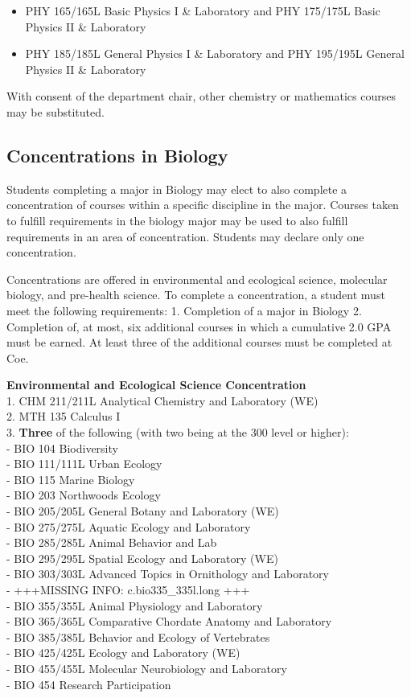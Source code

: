\documentclass[
  letterpaper,
]{scrbook}
\providecommand{\tightlist}{%
  \setlength{\itemsep}{0pt}\setlength{\parskip}{0pt}}
\begin{document}
\begin{itemize}
\tightlist
\item
  PHY 165/165L Basic Physics I \& Laboratory and PHY 175/175L Basic
  Physics II \& Laboratory
\item
  PHY 185/185L General Physics I \& Laboratory and PHY 195/195L General
  Physics II \& Laboratory
\end{itemize}

With consent of the department chair, other chemistry or mathematics
courses may be substituted.

\subsection{Concentrations in Biology}\label{concentrations-in-biology}

Students completing a major in Biology may elect to also complete a
concentration of courses within a specific discipline in the major.
Courses taken to fulfill requirements in the biology major may be used
to also fulfill requirements in an area of concentration. Students may
declare only one concentration.

Concentrations are offered in environmental and ecological science,
molecular biology, and pre-health science. To complete a concentration,
a student must meet the following requirements: 1. Completion of a major
in Biology 2. Completion of, at most, six additional courses in which a
cumulative 2.0 GPA must be earned. At least three of the additional
courses must be completed at Coe.

\textbf{Environmental and Ecological Science Concentration}\\
1. CHM 211/211L Analytical Chemistry and Laboratory (WE)\\
2. MTH 135 Calculus I\\
3. \textbf{Three} of the following (with two being at the 300 level or
higher):\\
- BIO 104 Biodiversity\\
- BIO 111/111L Urban Ecology\\
- BIO 115 Marine Biology\\
- BIO 203 Northwoods Ecology\\
- BIO 205/205L General Botany and Laboratory (WE)\\
- BIO 275/275L Aquatic Ecology and Laboratory\\
- BIO 285/285L Animal Behavior and Lab\\
- BIO 295/295L Spatial Ecology and Laboratory (WE)\\
- BIO 303/303L Advanced Topics in Ornithology and Laboratory\\
- +++MISSING INFO: c.bio335\_335l.long +++\\
- BIO 355/355L Animal Physiology and Laboratory\\
- BIO 365/365L Comparative Chordate Anatomy and Laboratory\\
- BIO 385/385L Behavior and Ecology of Vertebrates\\
- BIO 425/425L Ecology and Laboratory (WE)\\
- BIO 455/455L Molecular Neurobiology and Laboratory\\
- BIO 454 Research Participation
\end{document}
